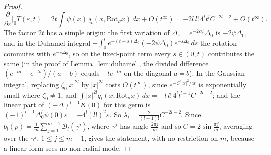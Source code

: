 \documentclass[pdflatex,sn-mathphys-num]{sn-jnl}
\theoremstyle{thmstyleone}%
\theoremstyle{thmstylethree}%
\begin{document}
\begin{proof}
\[
\frac{\partial}{\partial\varepsilon}\Big|_0T(\varepsilon,t)=2t\int\psi(x)\,q_t(x,\mathrm{Rot}_\vartheta x)\,dx+O(t^\infty)=-2l\,l!\,4^lt^lC^{-2l-2}+O(t^\infty).
\]
The factor $2t$ has a simple origin: the first variation of $\Delta_\varepsilon=e^{-2\varepsilon\psi}\Delta_0$ is $-2\psi\Delta_0$, and in the Duhamel integral $-\int_0^te^{-(t-s)\Delta_0}(-2\psi\Delta_0)e^{-s\Delta_0}\,ds$ the rotation commutes with $e^{-s\Delta_0}$, so on the fixed-point term every $s\in(0,t)$ contributes the same (in the proof of Lemma~\ref{lem:duhamel}, the divided difference $(e^{-ta}-e^{-tb})/(a-b)$ equals $-te^{-ta}$ on the diagonal $a=b$). In the Gaussian integral, replacing $\zeta_0|x|^{2l}$ by $|x|^{2l}$ costs $O(t^\infty)$, since $e^{-C^2|x|^2/4t}$ is exponentially small where $\zeta_0\ne1$, and $\int|x|^{2l}q_t(x,\mathrm{Rot}_\vartheta x)\,dx=-l\,l!\,4^lt^{l-1}C^{-2l-2}$; and the linear part of $(-\Delta)^{l-1}K(0)$ for this germ is $(-1)^{l-1}\Delta_0^l\psi(0)\varepsilon=-4^l(l!)^2\varepsilon$. So $\lambda_l=\frac{2}{(l-1)!}C^{-2l-2}$. Since $b_l(p)=\frac1m\sum_{j=1}^{m-1}\mathcal B_l(\gamma^j)$, where $\gamma^j$ has angle $\frac{2\pi j}m$ and so $C=2\sin\frac{\pi j}m$, averaging over the $\gamma^j$, $1\le j\le m-1$, gives the statement, with no restriction on $m$, because a linear form sees no non-radial mode.
\end{proof}
\end{document}
